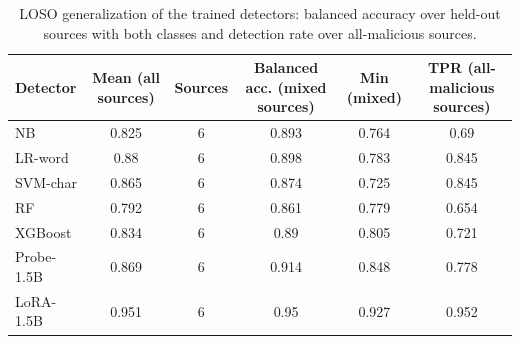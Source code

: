 \begin{table}[t]
\centering
\caption{LOSO generalization of the trained detectors: balanced accuracy over held-out sources with both classes and detection rate over all-malicious sources.}
\label{tab:losomean}
\footnotesize
\begin{tabular}{lccccc}
\toprule
\textbf{Detector} & \textbf{Mean (all sources)} & \textbf{Sources} & \textbf{Balanced acc. (mixed sources)} & \textbf{Min (mixed)} & \textbf{TPR (all-malicious sources)} \\
\midrule
NB & 0.825 & 6 & 0.893 & 0.764 & 0.69 \\
LR-word & 0.88 & 6 & 0.898 & 0.783 & 0.845 \\
SVM-char & 0.865 & 6 & 0.874 & 0.725 & 0.845 \\
RF & 0.792 & 6 & 0.861 & 0.779 & 0.654 \\
XGBoost & 0.834 & 6 & 0.89 & 0.805 & 0.721 \\
Probe-1.5B & 0.869 & 6 & 0.914 & 0.848 & 0.778 \\
LoRA-1.5B & 0.951 & 6 & 0.95 & 0.927 & 0.952 \\
\bottomrule
\end{tabular}
\end{table}